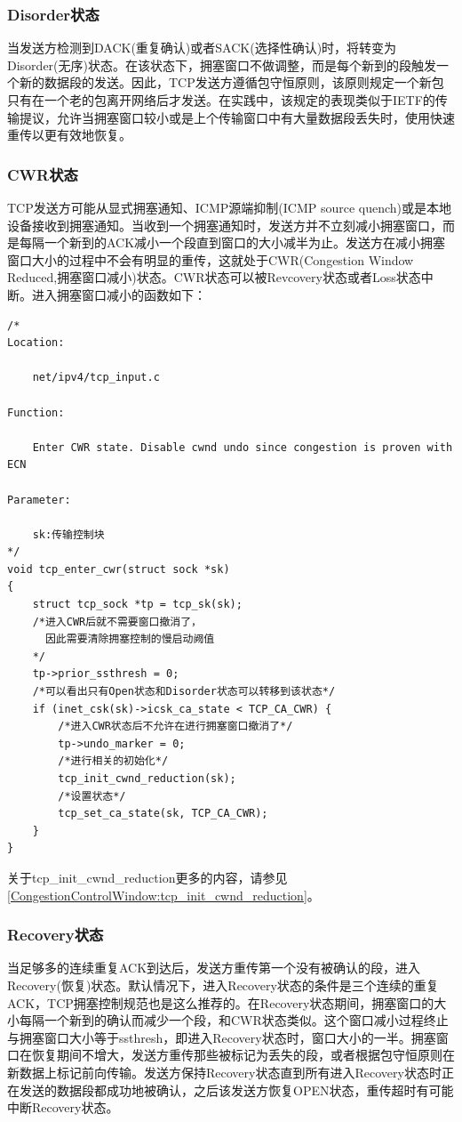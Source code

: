 		\subsubsection{Disorder状态}
			当发送方检测到DACK(重复确认)或者SACK(选择性确认)时，将转变为Disorder(无序)状态。在该状态下，拥塞窗口不做调整，而是每个新到的段触发一个新的数据段的发送。因此，TCP发送方遵循包守恒原则，该原则规定一个新包只有在一个老的包离开网络后才发送。在实践中，该规定的表现类似于IETF的传输提议，允许当拥塞窗口较小或是上个传输窗口中有大量数据段丢失时，使用快速重传以更有效地恢复。

		\subsubsection{CWR状态}
			\label{CongestionState:CWR}
			TCP发送方可能从显式拥塞通知、ICMP源端抑制(ICMP source quench)或是本地设备接收到拥塞通知。当收到一个拥塞通知时，发送方并不立刻减小拥塞窗口，而是每隔一个新到的ACK减小一个段直到窗口的大小减半为止。发送方在减小拥塞窗口大小的过程中不会有明显的重传，这就处于CWR(Congestion Window Reduced,拥塞窗口减小)状态。CWR状态可以被Revcovery状态或者Loss状态中断。进入拥塞窗口减小的函数如下：

\begin{verbatim}
/* 
Location:

	net/ipv4/tcp_input.c

Function:

	Enter CWR state. Disable cwnd undo since congestion is proven with ECN 

Parameter:

	sk:传输控制块
*/
void tcp_enter_cwr(struct sock *sk)
{
	struct tcp_sock *tp = tcp_sk(sk);
	/*进入CWR后就不需要窗口撤消了，
      因此需要清除拥塞控制的慢启动阙值
	*/
	tp->prior_ssthresh = 0;
	/*可以看出只有Open状态和Disorder状态可以转移到该状态*/
	if (inet_csk(sk)->icsk_ca_state < TCP_CA_CWR) {
		/*进入CWR状态后不允许在进行拥塞窗口撤消了*/		
		tp->undo_marker = 0;
		/*进行相关的初始化*/
		tcp_init_cwnd_reduction(sk);
		/*设置状态*/		
		tcp_set_ca_state(sk, TCP_CA_CWR);
	}
}
\end{verbatim}
		关于tcp\_init\_cwnd\_reduction更多的内容，请参见\ref{CongestionControlWindow:tcp_init_cwnd_reduction}。

		\subsubsection{Recovery状态}

			当足够多的连续重复ACK到达后，发送方重传第一个没有被确认的段，进入Recovery(恢复)状态。默认情况下，进入Recovery状态的条件是三个连续的重复ACK，TCP拥塞控制规范也是这么推荐的。在Recovery状态期间，拥塞窗口的大小每隔一个新到的确认而减少一个段，和CWR状态类似。这个窗口减小过程终止与拥塞窗口大小等于ssthresh，即进入Recovery状态时，窗口大小的一半。拥塞窗口在恢复期间不增大，发送方重传那些被标记为丢失的段，或者根据包守恒原则在新数据上标记前向传输。发送方保持Recovery状态直到所有进入Recovery状态时正在发送的数据段都成功地被确认，之后该发送方恢复OPEN状态，重传超时有可能中断Recovery状态。

